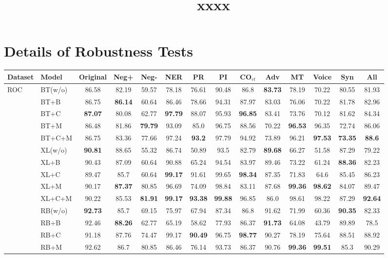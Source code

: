 \documentclass[11pt,a4paper]{article}
\title{xxxx}
\author{}
\date{}
\begin{document}
\appendix
\section{Details of Robustness Tests}
\begin{table*}[th]
\scriptsize
\centering
\begin{tabular}{ll|c|ccccccccccc}\hline
\toprule  
\textbf{Dataset}&\textbf{Model}&\textbf{Original} &\textbf{Neg+} & \textbf{Neg-} &\textbf{NER} &\textbf{PR} &\textbf{PI} 
                                               &\textbf{CO$_{rt}$}&\textbf{Adv}&\textbf{MT}&\textbf{Voice}&\textbf{Syn}&\textbf{All}
                                               \\ 
 \midrule
 \multirow{15}{*}{ROC} 
 		    
                &  BT(w/o) &86.58&82.19&59.57&78.18&76.61&90.48&86.8&\bf{83.73}&78.19&70.22&80.55&81.93
                						\\ 
		&  BT+B & 86.75&\bf{86.14}&60.64&86.46&78.66&94.31&87.97&83.03&76.06&70.22&81.78&82.96
 						        \\ 
		&  BT+C & \bf{87.07}&80.08&62.77&\bf{97.79}&88.07&95.93&\bf{96.85}&83.41&73.76&70.12&81.62&84.34
 						        \\ 
		   & BT+M & 86.48&81.86&\bf{79.79}&93.09&85.0&96.75&88.56&70.22&\bf{96.53}&96.35&72.74&86.06
 						       \\ 
		   & BT+C+M& 86.75&83.36&77.66&97.24&\bf{93.2}&97.79&94.92&73.89&96.21&\bf{97.53}&\bf{73.35}&\bf{88.6}
		
 					     	       \\ \cmidrule{2-14}
						          
		&  XL(w/o) & \bf{90.81}&88.65&55.32&86.74&50.89&93.5&82.79&\bf{89.68}&66.27&51.58&87.29&79.22
                						\\ 
		&  XL+B & 90.43&87.09&60.64&90.88&65.24&94.54&83.97&89.46&73.22&61.24&\bf{88.36}&82.23
 						        \\ 
		&  XL+C & 89.47&85.7&60.64&\bf{99.17}&91.61&99.65&\bf{98.34}&87.35&71.83&64.6&85.45&86.23
 						        \\ 
		   & XL+M & 90.17&\bf{87.37}&80.85&96.69&74.09&98.84&83.11&87.68&\bf{99.36}&\bf{98.62}&84.07&89.47

 						       \\ 
		   & XL+C+M& 90.22&85.53&\bf{81.91}&\bf{99.17}&\bf{93.38}&\bf{99.88}&96.85&86.0&98.61&98.22&87.29&\bf{92.64}
 					     	       \\ \cmidrule{2-14}
	&  RB(w/o) & \bf{92.73} &85.7&69.15&75.97&67.94&87.34&86.8&91.62&71.99&60.36&\bf{90.35}&82.33
                						\\ 
		&  RB+B & 92.46&\bf{88.26}&62.77&65.19&58.62&77.93&86.37&\bf{91.73}&64.08&43.79&89.89&78.5
 						        \\ 
		&  RB+C & 91.18 &87.76&74.47&99.17&\bf{90.49}&96.75&\bf{98.77}&90.27&78.19&75.64&88.51&88.92
 						        \\ 
		   & RB+M &92.62 &86.7&80.85&86.46&76.14&93.73&86.37&90.76&\bf{99.36}&\bf{99.51}&85.3&90.29


\end{tabular}
\end{table*}
\end{document}

